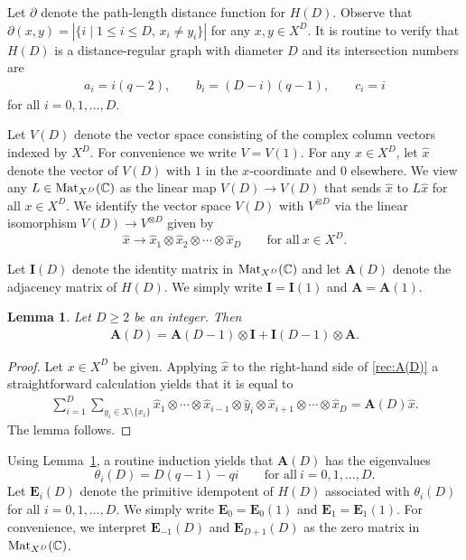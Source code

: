 \documentclass[10pt,a4paper]{amsart}
\def\A{\mathbf A}
\def\E{\mathbf E}
\def\C{\mathbb C}
\def\I{\mathbf I}
\def\Mat{{\rm Mat}}
\numberwithin{equation}{section}
\newtheorem{Lemma}[Theorem]{Lemma}
\begin{document}
Let $\partial$ denote the path-length distance function for $H(D)$. Observe that $\partial(x,y)=|\{i\mid 1\leq i\leq D,\, x_i\not=y_i\}|$ for any $x,y\in X^D$.
It is routine to verify that $H(D)$ is a distance-regular graph with diameter $D$ and its intersection numbers are
\begin{gather*}
a_i=i(q-2),\qquad
b_i=(D-i)(q-1),\qquad
c_i=i
\end{gather*}
for all $i=0,1,\dots,D$.

Let $V(D)$ denote the vector space consisting of the complex column vectors indexed by $X^D$. For convenience we write $V = V (1)$. For any $x\in X^D$, let $\hat{x}$ denote the vector of $V(D)$ with $1$ in the $x$-coordinate and $0$ elsewhere. We view any $L\in \Mat_{X^D}(\C)$ as the linear map $V(D)\to V(D)$ that sends $\hat{x}$ to $L\hat{x}$ for all $x\in X^D$. We identify the vector space $V (D)$ with $V ^{\otimes D}$ via the linear isomorphism $V (D) \to V^{\otimes D}$ given by
\[
\hat{x}\to \hat{x}_1 \otimes \hat{x}_2\otimes \cdots \otimes \hat{x}_D\qquad
\text{for all}\ x\in X^D.
\]

Let $\I(D)$ denote the identity matrix in $\Mat_{X^D}(\C)$ and let $\A(D)$ denote the adjacency matrix of $H(D)$. We simply write $\I=\I(1)$ and $\A=\A(1)$.

\begin{Lemma}\label{lem:A(D)}
Let $D\geq 2$ be an integer. Then
\begin{gather}\label{rec:A(D)}
\A(D)=\A(D-1)\otimes \I+\I(D-1)\otimes \A.
\end{gather}
\end{Lemma}
\begin{proof}
Let $x\in X^D$ be given. Applying $\hat x$ to the right-hand side of \eqref{rec:A(D)} a straightforward calculation yields that it is equal to
\begin{align*}
\sum_{i=1}^{D}
\sum_{y_i\in X\setminus\{x_i\}}
\hat x_1\otimes \cdots \otimes \hat x_{i-1}
\otimes \hat y_i\otimes \hat x_{i+1}
\otimes \cdots \otimes \hat x_D=\A(D)\hat x.
\end{align*}
The lemma follows.
\end{proof}

Using Lemma~\ref{lem:A(D)}, a routine induction yields that $\A(D)$ has the eigenvalues
\[
\theta_i(D)=D(q-1)-qi\qquad
\text{for all} \ i=0,1,\dots,D.
\]
Let $\E_i(D)$ denote the primitive idempotent of $H(D)$ associated with $\theta_i(D)$ for all $i=0,1,\dots,D$. We simply write $\E_0=\E_0(1)$ and $\E_1=\E_1(1)$. For convenience, we interpret $\E_{-1}(D)$ and $\E_{D+1}(D)$ as the zero matrix in $\Mat_{X^D}(\C)$.
\end{document}
